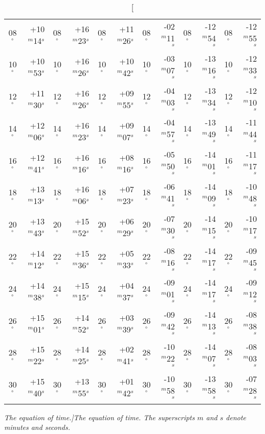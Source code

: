 \begin{table}
{\begin{tabular}{cr|cr|cr|cr|cr|cr}
08$^\circ$ & +10$^m$14$^s$ & 08$^\circ$ & +16$^m$23$^s$ & 08$^\circ$ & +11$^m$26$^s$ & 08$^\circ$ & -02$^m$11$^s$ & 08$^\circ$ & -12$^m$54$^s$ & 08$^\circ$ & -12$^m$55$^s$\\
10$^\circ$ & +10$^m$53$^s$ & 10$^\circ$ & +16$^m$26$^s$ & 10$^\circ$ & +10$^m$42$^s$ & 10$^\circ$ & -03$^m$07$^s$ & 10$^\circ$ & -13$^m$16$^s$ & 10$^\circ$ & -12$^m$33$^s$\\
12$^\circ$ & +11$^m$30$^s$ & 12$^\circ$ & +16$^m$26$^s$ & 12$^\circ$ & +09$^m$55$^s$ & 12$^\circ$ & -04$^m$03$^s$ & 12$^\circ$ & -13$^m$34$^s$ & 12$^\circ$ & -12$^m$10$^s$\\
14$^\circ$ & +12$^m$06$^s$ & 14$^\circ$ & +16$^m$23$^s$ & 14$^\circ$ & +09$^m$07$^s$ & 14$^\circ$ & -04$^m$57$^s$ & 14$^\circ$ & -13$^m$49$^s$ & 14$^\circ$ & -11$^m$44$^s$\\
16$^\circ$ & +12$^m$41$^s$ & 16$^\circ$ & +16$^m$16$^s$ & 16$^\circ$ & +08$^m$16$^s$ & 16$^\circ$ & -05$^m$50$^s$ & 16$^\circ$ & -14$^m$01$^s$ & 16$^\circ$ & -11$^m$17$^s$\\
18$^\circ$ & +13$^m$13$^s$ & 18$^\circ$ & +16$^m$06$^s$ & 18$^\circ$ & +07$^m$23$^s$ & 18$^\circ$ & -06$^m$41$^s$ & 18$^\circ$ & -14$^m$09$^s$ & 18$^\circ$ & -10$^m$48$^s$\\
20$^\circ$ & +13$^m$43$^s$ & 20$^\circ$ & +15$^m$52$^s$ & 20$^\circ$ & +06$^m$29$^s$ & 20$^\circ$ & -07$^m$30$^s$ & 20$^\circ$ & -14$^m$15$^s$ & 20$^\circ$ & -10$^m$17$^s$\\
22$^\circ$ & +14$^m$12$^s$ & 22$^\circ$ & +15$^m$36$^s$ & 22$^\circ$ & +05$^m$33$^s$ & 22$^\circ$ & -08$^m$16$^s$ & 22$^\circ$ & -14$^m$17$^s$ & 22$^\circ$ & -09$^m$45$^s$\\
24$^\circ$ & +14$^m$38$^s$ & 24$^\circ$ & +15$^m$15$^s$ & 24$^\circ$ & +04$^m$37$^s$ & 24$^\circ$ & -09$^m$01$^s$ & 24$^\circ$ & -14$^m$17$^s$ & 24$^\circ$ & -09$^m$12$^s$\\
26$^\circ$ & +15$^m$01$^s$ & 26$^\circ$ & +14$^m$52$^s$ & 26$^\circ$ & +03$^m$39$^s$ & 26$^\circ$ & -09$^m$42$^s$ & 26$^\circ$ & -14$^m$13$^s$ & 26$^\circ$ & -08$^m$38$^s$\\
28$^\circ$ & +15$^m$22$^s$ & 28$^\circ$ & +14$^m$25$^s$ & 28$^\circ$ & +02$^m$41$^s$ & 28$^\circ$ & -10$^m$22$^s$ & 28$^\circ$ & -14$^m$07$^s$ & 28$^\circ$ & -08$^m$03$^s$\\
30$^\circ$ & +15$^m$40$^s$ & 30$^\circ$ & +13$^m$55$^s$ & 30$^\circ$ & +01$^m$42$^s$ & 30$^\circ$ & -10$^m$58$^s$ & 30$^\circ$ & -13$^m$58$^s$ & 30$^\circ$ & -07$^m$28$^s$\\
\end{tabular}}
\caption[\em The equation of time.]{\em The equation of time. The superscripts $m$ and $s$ denote minutes and seconds.}\label{ttime}
\end{table}

